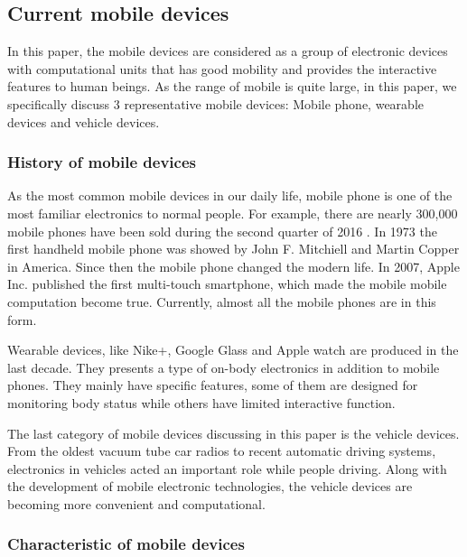 \documentclass[article]{aaltoseries}
\begin{document}


\subsection{Current mobile devices} %

In this paper, the mobile devices are considered as a group of electronic devices with
computational units that has good mobility and provides the interactive features to human beings.
As the range of mobile is quite large, in this paper, we specifically discuss 3 representative 
mobile devices: Mobile phone, wearable devices and vehicle devices.




\subsubsection{History of mobile devices}

As the most common mobile devices in our daily life, mobile phone is one of the most familiar 
electronics to normal people. For example, there are nearly 300,000 mobile phones have been 
sold during the second quarter of 2016 \cite{moblePhoneSale}. In 1973 the first handheld mobile phone
was showed by John F. Mitchiell and Martin Copper in America. Since then the mobile phone 
changed the modern life. In 2007, Apple Inc. published the first multi-touch smartphone,
 which made the mobile mobile computation become true.
  Currently, almost all the mobile phones are in this form. 


Wearable devices, like Nike+, Google Glass and Apple watch are produced in the last decade. They presents
a type of on-body electronics in addition to mobile phones. They mainly have specific features, some of them
are designed for monitoring body status while others have limited interactive function.

The last category of mobile devices discussing in this paper is the vehicle devices. From the oldest vacuum tube
car radios to recent automatic driving systems, electronics in vehicles acted an important role while people
driving. Along with the development of mobile electronic technologies, the vehicle devices are becoming more convenient
and computational.



\subsubsection{Characteristic of mobile devices}
\end{document}
